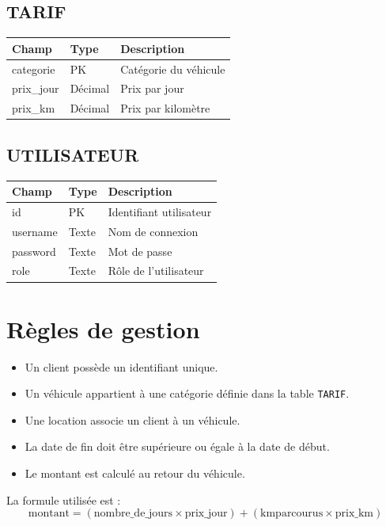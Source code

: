 \documentclass[12pt,a4paper]{report}
\begin{document}
\subsection{TARIF}
\begin{longtable}{|p{4cm}|p{3cm}|p{7cm}|}
\hline
\textbf{Champ} & \textbf{Type} & \textbf{Description} \\\hline
categorie & PK & Catégorie du véhicule \\\hline
prix\_jour & Décimal & Prix par jour \\\hline
prix\_km & Décimal & Prix par kilomètre \\\hline
\end{longtable}

\subsection{UTILISATEUR}
\begin{longtable}{|p{4cm}|p{3cm}|p{7cm}|}
\hline
\textbf{Champ} & \textbf{Type} & \textbf{Description} \\\hline
id & PK & Identifiant utilisateur \\\hline
username & Texte & Nom de connexion \\\hline
password & Texte & Mot de passe \\\hline
role & Texte & Rôle de l'utilisateur \\\hline
\end{longtable}

\section{Règles de gestion}
\begin{itemize}[leftmargin=1.2cm]
    \item Un client possède un identifiant unique.
    \item Un véhicule appartient à une catégorie définie dans la table \texttt{TARIF}.
    \item Une location associe un client à un véhicule.
    \item La date de fin doit être supérieure ou égale à la date de début.
    \item Le montant est calculé au retour du véhicule.
\end{itemize}

La formule utilisée est :
\[
\text{montant} = (\text{nombre\_de\_jours} \times \text{prix\_jour}) + (\text{kmparcourus} \times \text{prix\_km})
\]
\end{document}
